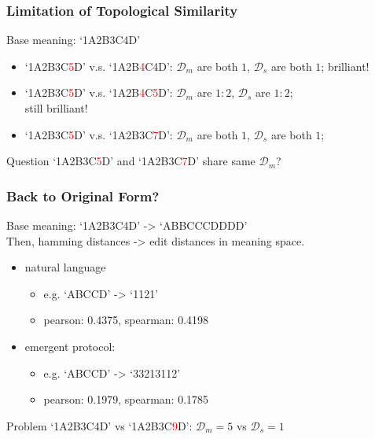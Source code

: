 \documentclass[compress,mathserif,xcolor=dvipsnames,svgnames,aspectratio=43]{beamer}
\begin{document}
\begin{frame}[c]
  \frametitle{Limitation of Topological Similarity}
  Base meaning: `1A2B3C4D'
  
  \begin{itemize}
    \item `1A2B3C\textcolor{red}{5}D' v.s. `1A2B\textcolor{red}{4}C4D': $\mathcal{D}_m$ are both $1$, $\mathcal{D}_s$ are both $1$; brilliant!
    \item `1A2B3C\textcolor{red}{5}D' v.s. `1A2B\textcolor{red}{4}C\textcolor{red}{5}D': $\mathcal{D}_m$ are $1:2$, $\mathcal{D}_s$ are $1:2$; \\still brilliant!
    \pause
    \item `1A2B3C\textcolor{red}{5}D' v.s. `1A2B3C\textcolor{red}{7}D': $\mathcal{D}_m$ are both $1$, $\mathcal{D}_s$ are both $1$;
  \end{itemize}

  \pause
  \begin{block}{Question}
    `1A2B3C\textcolor{red}{5}D' and `1A2B3C\textcolor{red}{7}D' share same $\mathcal{D}_m$?
  \end{block}

\end{frame}

\begin{frame}[c]
  \frametitle{Back to Original Form?}
  Base meaning: `1A2B3C4D' -> `ABBCCCDDDD' \\
  Then, hamming distances -> edit distances in meaning space.
  \begin{itemize}
    \item natural language
      \begin{itemize}
        \item e.g. `ABCCD' -> `1121'
        \item pearson: 0.4375, spearman: 0.4198
      \end{itemize}
    \item emergent protocol:
    \begin{itemize}
      \item e.g. `ABCCD' -> `33213112'
      \item pearson: 0.1979, spearman: 0.1785
    \end{itemize}
  \end{itemize}

  \begin{block}{Problem}
    `1A2B3C4D' vs `1A2B3C\textcolor{red}{9}D': $\mathcal{D}_m = 5$ vs $\mathcal{D}_s = 1$
  \end{block}
\end{frame}
\end{document}
